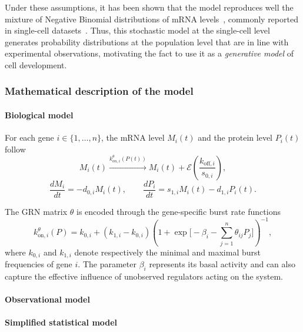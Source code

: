 Under these assumptions, it has been shown that the model reproduces well the mixture of Negative Binomial distributions of mRNA levels~\cite{ventre2022reverse}, commonly reported in single-cell datasets~\cite{albayrak2016digital}. Thus, this stochastic model at the single-cell level generates probability distributions at the population level that are in line with experimental observations, motivating the fact to use it as a \emph{generative model} of cell development.

\subsubsection*{Mathematical description of the model}
\paragraph{Biological model}
For each gene $i \in \{1,\dots,n\}$, the mRNA level $M_i(t)$ and the protein level $P_i(t)$
follow
\begin{equation*}
M_i(t) \xrightarrow{k_{on,i}^\theta(P(t))} M_i(t) + \mathcal{E}\left(\frac{k_{\mathrm{off}, i}}{s_{0, i}}\right), 
\end{equation*}
\begin{equation}
\label{eq:full_model}
\frac{dM_i}{dt} = - d_{0,i} M_i(t),
\qquad 
\frac{dP_i}{dt} = s_{1,i} M_i(t) - d_{1,i} P_i(t).
\end{equation}

The GRN matrix $\theta$ is encoded through the gene-specific burst rate
functions
\begin{equation}
\label{kon_function}
k^{\theta}_{\mathrm{on},i}(P)
 = k_{0,i} + (k_{1,i}-k_{0,i}) 
   \left( 1 + \exp{\Big[-\beta_i - \sum_{j=1}^n \theta_{ij} P_j\Big]}\right)^{-1},
\end{equation}
where $k_{0,i}$ and $k_{1,i}$ denote respectively the minimal and maximal burst frequencies of gene $i$. The parameter $\beta_i$ represents its basal activity and can also capture the effective influence of unobserved regulators acting on the system.

\paragraph{Observational model}


\paragraph{Simplified statistical model}

